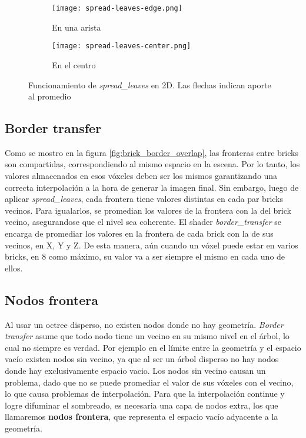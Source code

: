 \begin{figure}
    \begin{subfigure}{.5\textwidth}
        \centering
        \texttt{[image: spread-leaves-edge.png]}
        \caption{En una arista}
    \end{subfigure}
    \begin{subfigure}{.5\textwidth}
        \centering
        \texttt{[image: spread-leaves-center.png]}
        \caption{En el centro}
    \end{subfigure}
    \caption{Funcionamiento de \textit{spread\_leaves} en 2D. Las flechas indican aporte al promedio}
    \label{fig:spread-leaves}
\end{figure}

\subsection{Border transfer}\label{sec:border_transfer}

Como se mostro en la figura \ref{fig:brick_border_overlap}, las fronteras entre bricks son compartidas, correspondiendo al mismo espacio en la escena.
Por lo tanto, los valores almacenados en esos vóxeles deben ser los mismos garantizando una correcta interpolación a la hora de generar la imagen final.
Sin embargo, luego de aplicar \textit{spread\_leaves}, cada frontera tiene valores distintas en cada par bricks vecinos.
Para igualarlos, se promedian los valores de la frontera con la del brick vecino, asegurandose que el nivel sea coherente.
El shader \textit{border\_transfer} se encarga de promediar los valores en la frontera de cada brick con la de sus vecinos, en X, Y y Z.
De esta manera, aún cuando un vóxel puede estar en varios bricks, en $8$ como máximo, su valor va a ser siempre el mismo en cada uno de ellos. %


\subsection{Nodos frontera}

Al usar un octree disperso, no existen nodos donde no hay geometría.
\textit{Border transfer} asume que todo nodo tiene un vecino en su mismo nivel en el árbol, lo cual no siempre es verdad.
Por ejemplo en el límite entre la geometría y el espacio vacío existen nodos sin vecino, ya que al ser un árbol disperso no hay nodos donde hay exclusivamente espacio vacio.
Los nodos sin vecino causan un problema, dado que no se puede promediar el valor de sus vóxeles con el vecino, lo que causa problemas de interpolación.
Para que la interpolación continue y logre difuminar el sombreado, es necesaria una capa de nodos extra, los que llamaremos \textbf{nodos frontera}, que representa el espacio vacío adyacente a la geometría.

